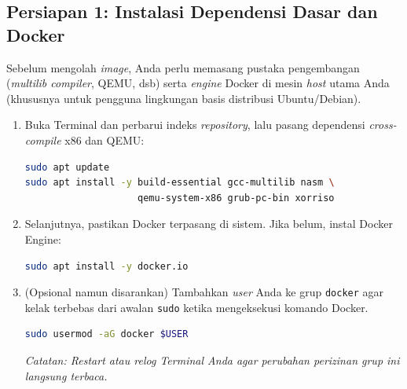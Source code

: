 \subsection{Persiapan 1: Instalasi Dependensi Dasar dan Docker}
\label{sec:m07-persiapan-install}
Sebelum mengolah \textit{image}, Anda perlu memasang pustaka pengembangan (\textit{multilib compiler}, QEMU, dsb) serta \textit{engine} Docker di mesin \textit{host} utama Anda (khususnya untuk pengguna lingkungan basis distribusi Ubuntu/Debian).
\begin{enumerate}
    \item Buka Terminal dan perbarui indeks \textit{repository}, lalu pasang dependensi \textit{cross-compile} x86 dan QEMU:
    \begin{lstlisting}[language=bash, caption={Instalasi pustaka dasar dan perangkat virtual QEMU}]
sudo apt update
sudo apt install -y build-essential gcc-multilib nasm \
                    qemu-system-x86 grub-pc-bin xorriso
    \end{lstlisting}
    \item Selanjutnya, pastikan Docker terpasang di sistem. Jika belum, instal Docker Engine:
    \begin{lstlisting}[language=bash, caption={Instalasi Docker Engine}]
sudo apt install -y docker.io
    \end{lstlisting}
    \item (Opsional namun disarankan) Tambahkan \textit{user} Anda ke grup \texttt{docker} agar kelak terbebas dari awalan \texttt{sudo} ketika mengeksekusi komando Docker.
    \begin{lstlisting}[language=bash, caption={Konfigurasi hak otorisasi akses pengguna Docker}]
sudo usermod -aG docker $USER
    \end{lstlisting}
    \textit{Catatan: \textit{Restart} atau \textit{relog} Terminal Anda agar perubahan perizinan grup ini langsung terbaca.}
\end{enumerate}

